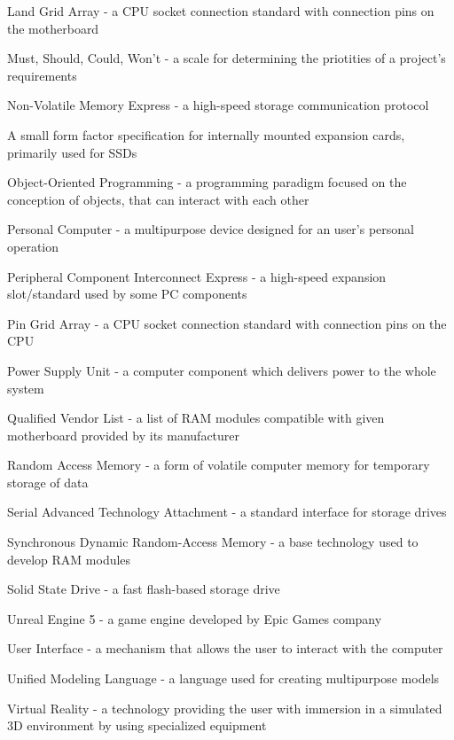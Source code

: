 \begin{abbrev}
\item[LGA] Land Grid Array - a CPU socket connection standard with connection pins on the motherboard
\item[MoSCoW] Must, Should, Could, Won't - a scale for determining the priotities of a project's requirements
\item[NVMe] Non-Volatile Memory Express - a high-speed storage communication protocol
\item[M.2] A small form factor specification for internally mounted expansion cards, primarily used for SSDs
\item[OOP] Object-Oriented Programming - a programming paradigm focused on the conception of objects, that can interact with each other
\item[PC] Personal Computer - a multipurpose device designed for an user's personal operation
\item[PCIe] Peripheral Component Interconnect Express - a high-speed expansion slot/standard used by some PC components
\item[PGA] Pin Grid Array - a CPU socket connection standard with connection pins on the CPU
\item[PSU] Power Supply Unit - a computer component which delivers power to the whole system 
\item[QVL] Qualified Vendor List - a list of RAM modules compatible with given motherboard provided by its manufacturer
\item[RAM] Random Access Memory - a form of volatile computer memory for temporary storage of data
\item[SATA] Serial Advanced Technology Attachment - a standard interface for storage drives
\item[SDRAM] Synchronous Dynamic Random-Access Memory - a base technology used to develop RAM modules
\item[SSD] Solid State Drive - a fast flash-based storage drive
\item[UE5] Unreal Engine 5 - a game engine developed by Epic Games company
\item[UI] User Interface - a mechanism that allows the user to interact with the computer
\item[UML] Unified Modeling Language - a language used for creating multipurpose models
\item[VR] Virtual Reality - a technology providing the user with immersion in a simulated 3D environment by using specialized equipment
\end{abbrev}

